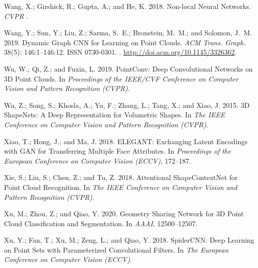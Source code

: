 \documentclass[letterpaper]{article} \usepackage{aaai21}  \usepackage{times}  \usepackage{helvet} \usepackage{courier}  \usepackage[hyphens]{url}  \usepackage{graphicx} \urlstyle{rm} \def\UrlFont{\rm}  \usepackage{natbib}  \usepackage{caption} \frenchspacing  \setlength{\pdfpagewidth}{8.5in}  \setlength{\pdfpageheight}{11in}  \usepackage{color}
\begin{document}
{\begin{thebibliography}{38}
Wang, X.; Girshick, R.; Gupta, A.; and He, K. 2018.
\newblock Non-local Neural Networks.
\newblock \emph{CVPR} .

Wang, Y.; Sun, Y.; Liu, Z.; Sarma, S.~E.; Bronstein, M.~M.; and Solomon, J.~M.
  2019{}.
\newblock Dynamic Graph CNN for Learning on Point Clouds.
\newblock \emph{ACM Trans. Graph.} 38(5): 146:1--146:12.
\newblock ISSN 0730-0301.
\newblock {}.
\newblock \urlprefix\url{http://doi.acm.org/10.1145/3326362}.

Wu, W.; Qi, Z.; and Fuxin, L. 2019.
\newblock PointConv: Deep Convolutional Networks on 3D Point Clouds.
\newblock In \emph{Proceedings of the IEEE/CVF Conference on Computer Vision
  and Pattern Recognition (CVPR)}.

Wu, Z.; Song, S.; Khosla, A.; Yu, F.; Zhang, L.; Tang, X.; and Xiao, J. 2015.
\newblock 3D ShapeNets: A Deep Representation for Volumetric Shapes.
\newblock In \emph{The IEEE Conference on Computer Vision and Pattern
  Recognition (CVPR)}.

Xiao, T.; Hong, J.; and Ma, J. 2018.
\newblock ELEGANT: Exchanging Latent Encodings with GAN for Transferring
  Multiple Face Attributes.
\newblock In \emph{Proceedings of the European Conference on Computer Vision
  (ECCV)}, 172--187.

Xie, S.; Liu, S.; Chen, Z.; and Tu, Z. 2018.
\newblock Attentional ShapeContextNet for Point Cloud Recognition.
\newblock In \emph{The IEEE Conference on Computer Vision and Pattern
  Recognition (CVPR)}.

Xu, M.; Zhou, Z.; and Qiao, Y. 2020.
\newblock Geometry Sharing Network for 3D Point Cloud Classification and
  Segmentation.
\newblock In \emph{AAAI}, 12500--12507.

Xu, Y.; Fan, T.; Xu, M.; Zeng, L.; and Qiao, Y. 2018.
\newblock SpiderCNN: Deep Learning on Point Sets with Parameterized
  Convolutional Filters.
\newblock In \emph{The European Conference on Computer Vision (ECCV)}.


\end{thebibliography}}
\end{document}
